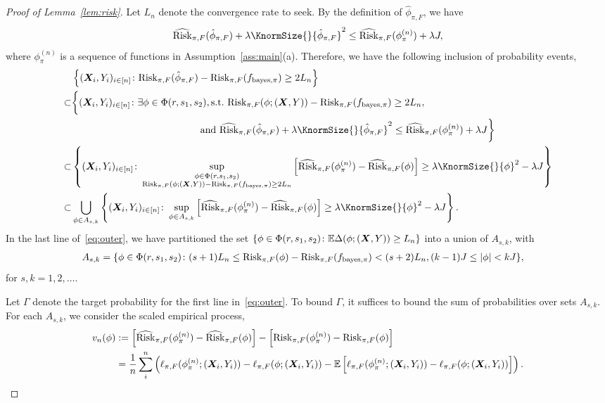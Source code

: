 \documentclass[11pt]{article}
\theoremstyle{plain}
\theoremstyle{definition}
\def\bayespif{f_{\textup{bayes},\pi}}
\def\riskF{\textup{Risk}_{\pi,F}}
\def\eriskF{\widehat{\textup{Risk}}_{\pi,F}}
\begin{document}
\begin{proof}[Proof of Lemma~\ref{lem:risk}]
Let $L_n$ denote the convergence rate to seek. By the definition of $\hat \phi_{\pi,F}$, we have
\[
 \eriskF(\hat\phi_{\pi,F})+\lambda\KnormSize{}{\hat \phi_{\pi,F}}^2\leq \eriskF(\phi_{\pi}^{(n)})+\lambda J,
\]
where $\phi_{\pi}^{(n)}$ is a sequence of functions in Assumption~\ref{ass:main}(a). Therefore, we have the following inclusion of probability events,
\begin{align}\label{eq:outer}
&\left\{(\mX_i,Y_i)_{i\in[n]}\colon \riskF(\hat\phi_{\pi,F})-\riskF(\bayespif)\geq 2L_n \right\}\notag \\
 \subset &
 \bigg\{(\mX_i,Y_i)_{i\in[n]}\colon \exists \phi\in\Phi(r,s_1,s_2), \text{s.t.}\  \riskF(\phi; (\mX,Y))-\riskF(\bayespif)\geq 2L_n, \notag \\&\hspace*{4.6cm} \text{and}\  \eriskF(\hat\phi_{\pi,F})+\lambda\KnormSize{}{\hat \phi_{\pi,F}}^2\leq \eriskF(\phi_{\pi}^{(n)})+\lambda J \bigg\}\notag \\
 \subset &
\left\{(\mX_i,Y_i)_{i\in[n]} \colon \sup_{\substack{\phi\in\Phi(r,s_1,s_2)\\  
\riskF(\phi; (\mX,Y))-\riskF(\bayespif)\geq 2L_n  }}\left[\eriskF(\phi_\pi^{(n)})-\eriskF(\phi)\right]\geq \lambda\KnormSize{}{\phi}^2-\lambda J  \right\} \notag \\
\subset & \bigcup_{\phi\in A_{s,k}}\left\{(\mX_i,Y_i)_{i\in[n]}\colon \sup_{\phi\in A_{s,k}} \left[\eriskF(\phi_\pi^{(n)})-\eriskF(\phi)\right]\geq \lambda\KnormSize{}{\phi}^2-\lambda J \right \}.
\end{align}
In the last line of~\eqref{eq:outer}, we have partitioned the set $\{\phi\in\Phi(r,s_1,s_2)\colon \mathbb{E}\Delta(\phi;(\bm X,Y))\geq L_n\}$ into a union of $A_{s,k}$, with 
\begin{align}
A_{s,k}&=\{\phi\in \Phi(r,s_1,s_2)\colon (s+1)L_n\leq \riskF(\phi)-\riskF(\bayespif)< (s+2) L_n, (k-1) J \leq |\phi|< k J\},
\end{align}
for $s,k=1,2,\ldots$. 


Let $\Gamma$ denote the target probability for the first line in~\eqref{eq:outer}. To bound $\Gamma$, it suffices to bound the sum of probabilities over sets $A_{s,k}$.  For  each $ A_{s,k}$, we consider the scaled empirical process,
\begin{align}\label{eq:empro}
v_n(\phi)&:=\left[\eriskF(\phi_\pi^{(n)})-\eriskF(\phi)\right]-\left[\riskF(\phi_\pi^{(n)})-\riskF(\phi)\right]\\&=\frac{1}{n}\sum_{i}^n\left(\ell_{\pi,F}(\phi_\pi^{(n)};(\mX_i,Y_i))-\ell_{\pi,F}(\phi;(\mX_i,Y_i))-\mathbb{E}\left[\ell_{\pi,F}(\phi_\pi^{(n)};(\mX_i,Y_i))-\ell_{\pi,F}(\phi;(\mX_i,Y_i))\right]\right) .
\end{align}


\end{proof}
\end{document}
